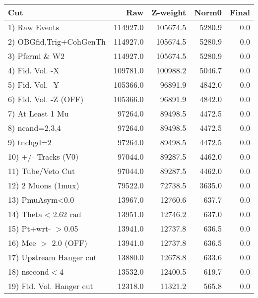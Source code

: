  \begin{table}[h!]\centering
 \begin{tabular}{||l||r|r|r|r||}
 \hline
 \hline
 Cut & Raw & Z-weight & Norm0 & Final \\
 \hline
  1) Raw Events           &    114927.0 &    105674.5 &      5280.9 &         0.0 \\
  2) OBGfid,Trig+CohGenTh &    114927.0 &    105674.5 &      5280.9 &         0.0 \\
  3) Pfermi \& W2         &    114927.0 &    105674.5 &      5280.9 &         0.0 \\
  4) Fid. Vol. -X         &    109781.0 &    100988.2 &      5046.7 &         0.0 \\
  5) Fid. Vol. -Y         &    105366.0 &     96891.9 &      4842.0 &         0.0 \\
  6) Fid. Vol. -Z (OFF)   &    105366.0 &     96891.9 &      4842.0 &         0.0 \\
  7) At Least 1 Mu        &     97264.0 &     89498.5 &      4472.5 &         0.0 \\
  8) ncand=2,3,4          &     97264.0 &     89498.5 &      4472.5 &         0.0 \\
  9) tnchgd=2             &     97264.0 &     89498.5 &      4472.5 &         0.0 \\
 10) +/- Tracks (V0)      &     97044.0 &     89287.5 &      4462.0 &         0.0 \\
 11) Tube/Veto Cut        &     97044.0 &     89287.5 &      4462.0 &         0.0 \\
 12) 2 Muons (1mux)       &     79522.0 &     72738.5 &      3635.0 &         0.0 \\
 13) PmuAsym<0.0          &     13967.0 &     12760.6 &       637.7 &         0.0 \\
 14) Theta$<$2.62 rad     &     13951.0 &     12746.2 &       637.0 &         0.0 \\
 15) Pt+wrt- $>$0.05      &     13941.0 &     12737.8 &       636.5 &         0.0 \\
 16) Mee $>$ 2.0  (OFF)   &     13941.0 &     12737.8 &       636.5 &         0.0 \\
 17) Upstream Hanger cut  &     13880.0 &     12678.8 &       633.6 &         0.0 \\
 18) nsecond$<$4          &     13532.0 &     12400.5 &       619.7 &         0.0 \\
 19) Fid. Vol. Hanger cut &     12318.0 &     11321.2 &       565.8 &         0.0 \\

\end{tabular}
\end{table}
